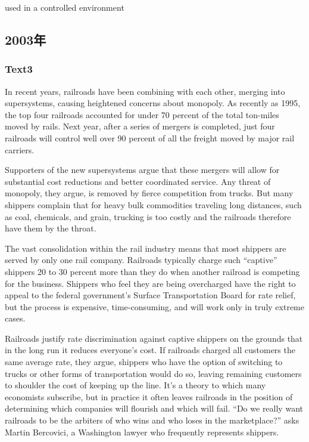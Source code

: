 \documentclass[a4paper]{article}
\begin{document}
used in a controlled environment\\\subsection{2003年}
\subsubsection{Text3}

\par
In recent years, railroads have been combining with each other, merging into supersystems, causing heightened concerns about monopoly. As recently as 1995, the top four railroads accounted for under 70 percent of the total ton-miles moved by rails. Next year, after a series of mergers is completed, just four railroads will control well over 90 percent of all the freight moved by major rail carriers.

\par
Supporters of the new supersystems argue that these mergers will allow for substantial cost reductions and better coordinated service. Any threat of monopoly, they argue, is removed by fierce competition from trucks. But many shippers complain that for heavy bulk commodities traveling long distances, such as coal, chemicals, and grain, trucking is too costly and the railroads therefore have them by the throat.

\par
The vast consolidation within the rail industry means that most shippers are served by only one rail company. Railroads typically charge such “captive” shippers 20 to 30 percent more than they do when another railroad is competing for the business. Shippers who feel they are being overcharged have the right to appeal to the federal government’s Surface Transportation Board for rate relief, but the process is expensive, time-consuming, and will work only in truly extreme cases.

\par
Railroads justify rate discrimination against captive shippers on the grounds that in the long run it reduces everyone’s cost. If railroads charged all customers the same average rate, they argue, shippers who have the option of switching to trucks or other forms of transportation would do so, leaving remaining customers to shoulder the cost of keeping up the line. It’s a theory to which many economists subscribe, but in practice it often leaves railroads in the position of determining which companies will flourish and which will fail. “Do we really want railroads to be the arbiters of who wins and who loses in the marketplace?” asks Martin Bercovici, a Washington lawyer who frequently represents shippers.
\end{document}
